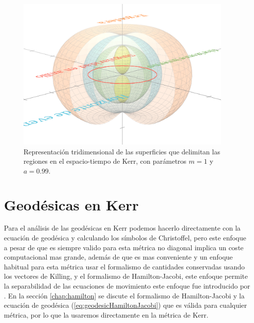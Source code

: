 \begin{figure}[H]
    \begin{small}
        \begin{center}
            \includegraphics[width=0.95\textwidth]{AgujerosNegros/kerr/media/images/kerr_BH_regions_ManimCE_v0.19.0.png}
        \end{center}
        \caption{Representación tridimensional de las superficies que delimitan las regiones en el espacio-tiempo de Kerr, con parámetros $m=1$ y $a=0.99$.}
        \label{fig:kerr_BH_regions}
    \end{small}
\end{figure}

\section{Geodésicas en Kerr}
Para el análisis de las geodésicas en Kerr podemos hacerlo directamente con la ecuación de geodésica y calculando los símbolos de Christoffel, pero este enfoque a pesar de que es siempre valido para esta métrica no diagonal implica un coste computacional mas grande, además de que es  mas conveniente y un enfoque habitual para esta métrica usar el formalismo de cantidades conservadas usando los vectores de Killing, y el formalismo de Hamilton-Jacobi, este enfoque permite la separabilidad de las ecuaciones de movimiento este enfoque fue introducido por \cite{carter-1968}.
En la sección \ref{chap:hamilton} se discute el formalismo de Hamilton-Jacobi y la ecuación de geodésica (\ref{eq:geodesicHamiltonJacobi}) que es válida para cualquier métrica, por lo que la usaremos directamente en la métrica de Kerr.

